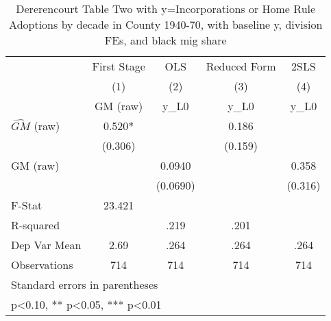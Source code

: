\begin{table}[htbp]\centering
\def\sym#1{\ifmmode^{#1}\else\(^{#1}\)\fi}
\caption{Dererencourt Table Two with y=Incorporations or Home Rule Adoptions by decade in County 1940-70, with baseline y, division FEs, and black mig share}
\begin{tabular}{l*{4}{c}}
\toprule
                    & First Stage   &         OLS   &Reduced Form   &        2SLS   \\
                    &\multicolumn{1}{c}{(1)}&\multicolumn{1}{c}{(2)}&\multicolumn{1}{c}{(3)}&\multicolumn{1}{c}{(4)}\\
                    &\multicolumn{1}{c}{GM  (raw)}&\multicolumn{1}{c}{y\_L0}&\multicolumn{1}{c}{y\_L0}&\multicolumn{1}{c}{y\_L0}\\
\midrule
$\hat{GM}$ (raw)    &       0.520*  &               &       0.186   &               \\
                    &     (0.306)   &               &     (0.159)   &               \\
\addlinespace
GM  (raw)           &               &      0.0940   &               &       0.358   \\
                    &               &    (0.0690)   &               &     (0.316)   \\
\midrule
F-Stat              &      23.421   &               &               &               \\
R-squared           &               &        .219   &        .201   &               \\
Dep Var Mean        &        2.69   &        .264   &        .264   &        .264   \\
Observations        &         714   &         714   &         714   &         714   \\
\bottomrule
\multicolumn{5}{l}{\footnotesize Standard errors in parentheses}\\
\multicolumn{5}{l}{\footnotesize * p<0.10, ** p<0.05, *** p<0.01}\\
\end{tabular}
\end{table}
